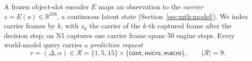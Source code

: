 A frozen object-slot encoder $E$ maps an observation to the \emph{carrier} $z=E(o)\in\mathbb{R}^{236}$, a continuous latent state (Section~\ref{sec:mth:model}). We index carrier frames by $k$, with $z_k$ the carrier of the $k$-th captured frame after the decision step; on N1 captures one carrier frame spans 50 engine steps. Every world-model query carries a \emph{prediction request}
\begin{equation}
r=(\Delta,\alpha)\in\mathcal{R}=\{1,5,15\}\times\{\textsf{cont},\textsf{micro},\textsf{macro}\},\qquad|\mathcal{R}|=9 .
\label{eq:requests}
\end{equation}
